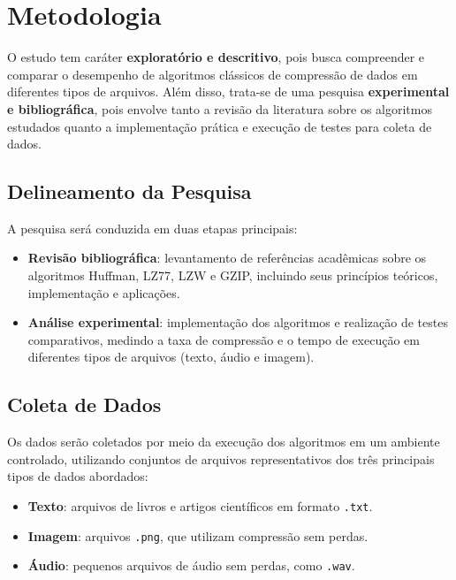 \chapter{Metodologia}
\label{c.metodologia}

O estudo tem caráter \textbf{exploratório e descritivo}, pois busca compreender e comparar o desempenho de algoritmos clássicos de compressão de dados em diferentes tipos de arquivos. Além disso, trata-se de uma pesquisa \textbf{experimental e bibliográfica}, pois envolve tanto a revisão da literatura sobre os algoritmos estudados quanto a implementação prática e execução de testes para coleta de dados.

\section{Delineamento da Pesquisa}

A pesquisa será conduzida em duas etapas principais:

\begin{itemize}
    \item \textbf{Revisão bibliográfica}: levantamento de referências acadêmicas sobre os algoritmos Huffman, LZ77, LZW e GZIP, incluindo seus princípios teóricos, implementação e aplicações.
    \item \textbf{Análise experimental}: implementação dos algoritmos e realização de testes comparativos, medindo a taxa de compressão e o tempo de execução em diferentes tipos de arquivos (texto, áudio e imagem).
\end{itemize}

\section{Coleta de Dados}

Os dados serão coletados por meio da execução dos algoritmos em um ambiente controlado, utilizando conjuntos de arquivos representativos dos três principais tipos de dados abordados: 

\begin{itemize}
    \item \textbf{Texto}: arquivos de livros e artigos científicos em formato \texttt{.txt}.
    \item \textbf{Imagem}: arquivos \texttt{.png}, que utilizam compressão sem perdas.
    \item \textbf{Áudio}: pequenos arquivos de áudio sem perdas, como \texttt{.wav}.
\end{itemize}

